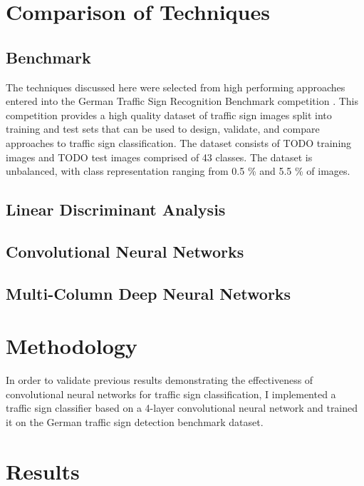 \documentclass[letterpaper,twocolumn,10pt]{article}
\begin{document}
\section{Comparison of Techniques}

\subsection{Benchmark}

The techniques discussed here were selected from high performing approaches entered into the German Traffic Sign Recognition Benchmark competition \cite{stallkamp_german_2011, stallkamp_man_2012}. This competition provides a high quality dataset of traffic sign images split into training and test sets that can be used to design, validate, and compare approaches to traffic sign classification. The dataset consists of TODO training images and TODO test images comprised of 43 classes. The dataset is unbalanced, with class representation ranging from 0.5 \% and 5.5 \% of images.

\subsection{Linear Discriminant Analysis}

\subsection{Convolutional Neural Networks}

\subsection{Multi-Column Deep Neural Networks}


\section{Methodology}

In order to validate previous results demonstrating the effectiveness of convolutional neural networks for traffic sign classification, I implemented a traffic sign classifier based on a 4-layer convolutional neural network and trained it on the German traffic sign detection benchmark dataset. 


\section{Results}
\end{document}
